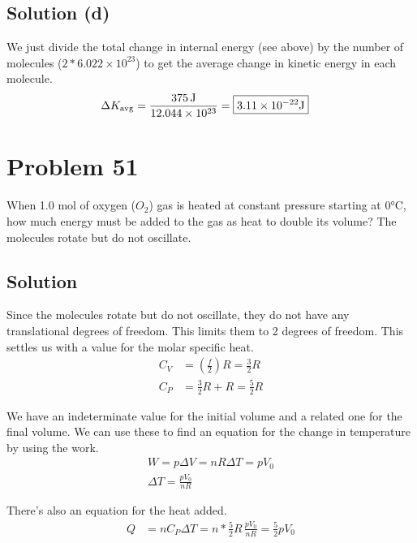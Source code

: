\documentclass[12pt]{article}
\newcommand{\E}[1]{\times 10^{#1}}
\begin{document}
        \subsection{Solution (d)}
            We just divide the total change in internal energy (see above) by the number of molecules ($2 * 6.022\E{23}$) to get the average change in kinetic energy in each molecule.
            \begin{align}
                \Delta K_{\rm avg}  &=  \frac{375\,\unit{\joule}}{12.044\E{23}}
                    =   \boxed{3.11\E{-22}\unit{\joule}}
            \end{align}

    \pagebreak
    \section{Problem 51}
        When 1.0 mol of oxygen ($O_2$) gas is heated at constant pressure starting at 0°C, how much energy must be added to the gas as heat to double its volume? 
        The molecules rotate but do not oscillate.

        \subsection{Solution}
            Since the molecules rotate but do not oscillate, they do not have any translational degrees of freedom.
            This limits them to 2 degrees of freedom.
            This settles us with a value for the molar specific heat.
            \begin{align}
                C_V &=  \left( \frac{f}{2} \right)R 
                    =   \frac{3}{2}R\\
                C_P &=  \frac{3}{2}R + R
                    =   \frac{5}{2}R
            \end{align}

            We have an indeterminate value for the initial volume and a related one for the final volume.
            We can use these to find an equation for the change in temperature by using the work.
            \begin{gather}
                W   =   p\Delta V = nR\Delta T = pV_0\\
                \Delta T    =   \frac{pV_0}{nR}
            \end{gather}

            There's also an equation for the heat added.
            \begin{align}
                Q   &=  nC_P \Delta T
                    =   n * \frac{5}{2}R\,\frac{pV_0}{nR}
                    =   \frac{5}{2} pV_0
            \end{align}
\end{document}
